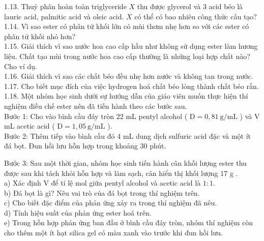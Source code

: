 \documentclass[10pt]{article}
\begin{document}
1.13. Thuỷ phân hoàn toàn triglyceride $X$ thu được glycerol và 3 acid béo là lauric acid, palmitic acid và oleic acid. $X$ có thể có bao nhiêu công thức cấu tạo?\\
1.14. Vì sao ester có phân tử khối lớn có mùi thơm nhẹ hơn so với các ester có phân tử khối nhỏ hơn?\\
1.15. Giải thích vì sao nước hoa cao cấp hầu như không sử dụng ester làm hương liệu. Chất tạo mùi trong nước hoa cao cấp thường là những loại hợp chất nào? Cho ví dụ.\\
1.16. Giải thích vì sao các chất béo đều nhẹ hơn nước và không tan trong nước.\\
1.17. Cho biết mục đích của việc hydrogen hoá chất béo lỏng thành chất béo rắn.\\
1.18. Một nhóm học sinh dưới sự hướng dẫn của giáo viên muốn thực hiện thí nghiệm điều chế ester nên đã tiến hành theo các bước sau.\\
Bước 1: Cho vào bình cầu đáy tròn 22 mL pentyl alcohol ( $\mathrm{D}=0,81 \mathrm{~g} / \mathrm{mL}$ ) và V mL acetic acid ( $\mathrm{D}=1,05 \mathrm{~g} / \mathrm{mL}$ ).\\
Bước 2: Thêm tiếp vào bình cầu đó 4 mL dung dịch sulfuric acid đặc và một ít đá bọt. Đun hồi lưu hỗn hợp trong khoảng 30 phút.

Bước 3: Sau một thời gian, nhóm học sinh tiến hành cân khối lượng ester thu được sau khi tách khỏi hỗn hợp và làm sạch, cân hiển thị khối lượng 17 g .\\
a) Xác định V để tỉ lệ mol giữa pentyl alcohol và acetic acid là $1: 1$.\\
b) Đá bọt là gì? Nêu vai trò của đá bọt trong thí nghiệm trên.\\
c) Cho biết đặc điểm của phản ứng xảy ra trong thí nghiệm đã nêu.\\
d) Tính hiệu suất của phản ứng ester hoá trên.\\
e) Trong hỗn hợp phản ứng ban đầu ở bình cầu đáy tròn, nhóm thí nghiệm còn cho thêm một ít hạt silica gel có màu xanh vào trước khi đun hồi lưu.
\end{document}
